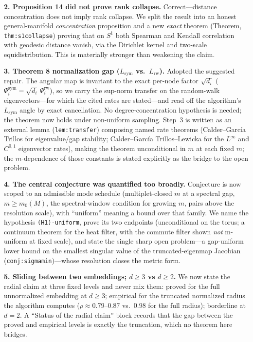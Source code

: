 \documentclass[11pt]{article}
\begin{document}
\textbf{2. Proposition 14 did not prove rank collapse.} Correct---distance
concentration does not imply rank collapse. We split the result into an honest
general-manifold \emph{concentration} proposition and a new \emph{exact} theorem
(Theorem, \texttt{thm:s1collapse}) proving that on $S^1$ both Spearman and Kendall
correlation with geodesic distance vanish, via the Dirichlet kernel and two-scale
equidistribution. This is materially stronger than weakening the claim.

\textbf{3. Theorem 8 normalization gap ($L_{\mathrm{sym}}$ vs.\ $L_{\mathrm{rw}}$).}
Adopted the suggested repair. The angular map is invariant to the exact per-node
factor $\sqrt{d_i}$ ($\Psi_i^{\mathrm{sym}}=\sqrt{d_i}\,\Psi_i^{\mathrm{rw}}$), so
we carry the sup-norm transfer on the random-walk eigenvectors---for which the
cited rates are stated---and read off the algorithm's $L_{\mathrm{sym}}$ angle by
exact cancellation. No degree-concentration hypothesis is needed; the theorem now
holds under non-uniform sampling. Step~3 is written as an external lemma
(\texttt{lem:transfer}) composing named rate theorems (Calder--Garc\'ia Trillos
for eigenvalue/gap stability; Calder--Garc\'ia Trillos--Lewicka for the $L^\infty$
and $C^{0,1}$ eigenvector rates), making the theorem unconditional in $m$ at each
fixed $m$; the $m$-dependence of those constants is stated explicitly as the
bridge to the open problem.

\textbf{4. The central conjecture was quantified too broadly.} Conjecture is now
scoped to an admissible mode schedule (multiplet-closed $m$ at a spectral gap,
$m\ge m_0(M)$, the spectral-window condition for growing $m$, pairs above the
resolution scale), with ``uniform'' meaning a bound over that family. We name the
hypothesis \texttt{(H1)-uniform}, prove its two endpoints (unconditional on the
torus; a continuum theorem for the heat filter, with the commute filter shown
\emph{not} m-uniform at fixed scale), and state the single sharp open problem---a
gap-uniform lower bound on the smallest singular value of the truncated-eigenmap
Jacobian (\texttt{conj:sigmamin})---whose resolution closes the metric form.

\textbf{5. Sliding between two embeddings; $d\ge3$ vs $d\ge2$.} We now state the
radial claim at three fixed levels and never mix them: proved for the full
unnormalized embedding at $d\ge3$; empirical for the truncated normalized radius
the algorithm computes ($\rho\approx0.79$--$0.87$ vs.\ $0.98$ for the full
radius); borderline at $d=2$. A ``Status of the radial claim'' block records that
the gap between the proved and empirical levels is exactly the truncation, which
no theorem here bridges.
\end{document}
